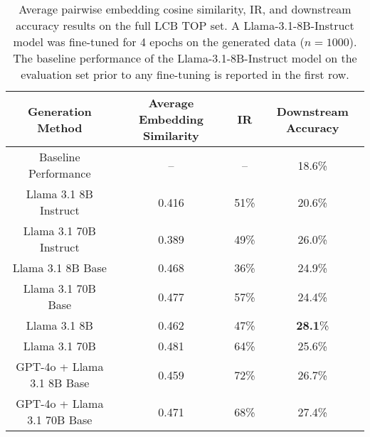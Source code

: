 \begin{table}[H]
\caption{Average pairwise embedding cosine similarity, IR, and downstream accuracy results on the full LCB TOP set. A Llama-3.1-8B-Instruct model was fine-tuned for 4 epochs on the generated data ($n=1000$). The baseline performance of the Llama-3.1-8B-Instruct model on the evaluation set prior to any fine-tuning is reported in the first row.}
\label{lcb-core}
\vskip 0.1in
\begin{center}
\begin{small}
\begin{sc}
\begin{tabular}{c|ccc}
\toprule
Generation Method & Average Embedding Similarity & IR & Downstream Accuracy \\
\midrule
Baseline Performance               &   --  &  --  & 18.6\% \\
\midrule
Llama 3.1 8B Instruct              & 0.416 & 51\% & 20.6\% \\
Llama 3.1 70B Instruct             & 0.389 & 49\% & 26.0\% \\
Llama 3.1 8B Base                  & 0.468 & 36\% & 24.9\% \\
Llama 3.1 70B Base                 & 0.477 & 57\% & 24.4\% \\
\Sys{} Llama 3.1 8B                & 0.462 & 47\% & \textbf{28.1}\% \\
\Sys{} Llama 3.1 70B               & 0.481 & 64\% & 25.6\% \\
\Sys{} GPT-4o + Llama 3.1 8B Base  & 0.459 & 72\% & 26.7\% \\
\Sys{} GPT-4o + Llama 3.1 70B Base & 0.471 & 68\% & 27.4\% \\
\bottomrule
\end{tabular}
\end{sc}
\end{small}
\end{center}
\vskip -0.1in
\end{table}
